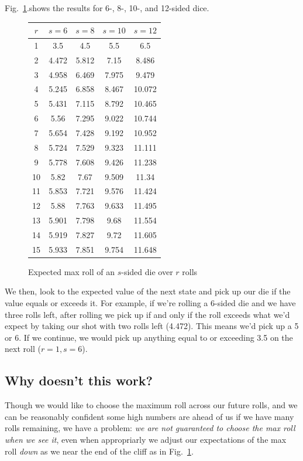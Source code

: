\documentclass[11pt, oneside]{article} 	%
\begin{document}
 Fig.~\ref{fig:max-rolls}.shows the results for 6-, 8-, 10-, and 12-sided dice.

\begin{figure}[!htb]
\centering
\begin{tabular}{c | c c c c}
$r$ & $s=6$ & $s=8$  & $s=10$ & $s=12$  \\
\hline
1 & 3.5 & 4.5 & 5.5 & 6.5 \\
2 & 4.472 & 5.812 & 7.15 & 8.486 \\
3 & 4.958 & 6.469 & 7.975 & 9.479 \\
4 & 5.245 & 6.858 & 8.467 & 10.072 \\
5 & 5.431 & 7.115 & 8.792 & 10.465 \\
6 & 5.56 & 7.295 & 9.022 & 10.744 \\
7 & 5.654 & 7.428 & 9.192 & 10.952 \\
8 & 5.724 & 7.529 & 9.323 & 11.111 \\
9 & 5.778 & 7.608 & 9.426 & 11.238 \\
10 & 5.82 & 7.67 & 9.509 & 11.34 \\
11 & 5.853 & 7.721 & 9.576 & 11.424 \\
12 & 5.88 & 7.763 & 9.633 & 11.495 \\
13 & 5.901 & 7.798 & 9.68 & 11.554 \\
14 & 5.919 & 7.827 & 9.72 & 11.605 \\
15 & 5.933 & 7.851 & 9.754 & 11.648 \\
\end{tabular}
\caption{Expected max roll of an $s$-sided die over $r$ rolls}
\label{fig:max-rolls}
\end{figure}

We then, look to the expected value of the next state and pick up our die if the value equals or exceeds it. For example, if we're rolling a 6-sided die and we have three rolls left, after rolling we pick up if and only if the roll exceeds what we'd expect by taking our shot with two rolls left (4.472). This means we'd pick up a 5 or 6. If we continue, we would pick up anything equal to or exceeding 3.5 on the next roll ($r=1, s=6$).

\subsection{Why doesn't this work?}

Though we would like to choose the maximum roll across our future rolls, and we can be reasonably confident some high numbers are ahead of us if we have many rolls remaining, we have a problem: \emph{we are not guaranteed to choose the max roll when we see it}, even when appropriarly we adjust our expectations of the max roll \emph{down} as we near the end of the cliff as in Fig.~\ref{fig:max-rolls}.
\end{document}
